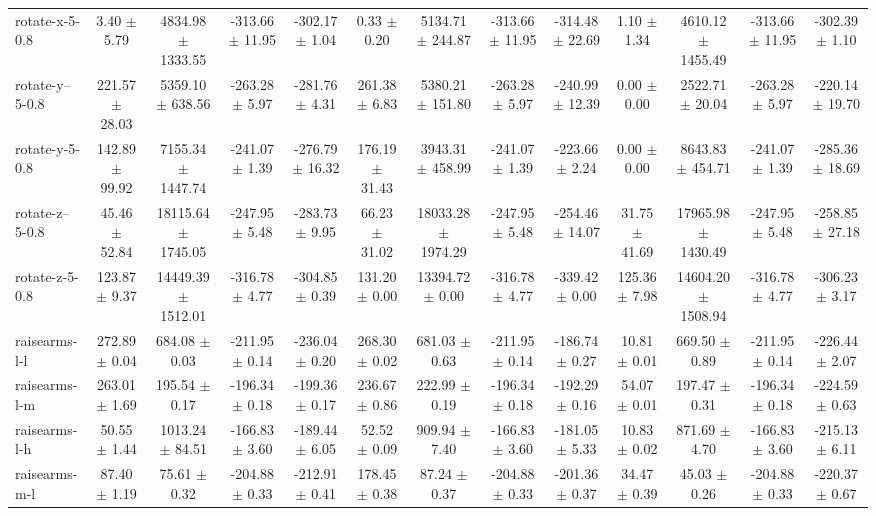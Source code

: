 \begin{tabular}{|lcccccccccccc|}
rotate-x-5-0.8 & 3.40 $\pm$ 5.79 & 4834.98 $\pm$ 1333.55 & -313.66 $\pm$ 11.95 & -302.17 $\pm$ 1.04 & 0.33 $\pm$ 0.20 & 5134.71 $\pm$ 244.87 & -313.66 $\pm$ 11.95 & -314.48 $\pm$ 22.69 & 1.10 $\pm$ 1.34 & 4610.12 $\pm$ 1455.49 & -313.66 $\pm$ 11.95 & -302.39 $\pm$ 1.10 \\
rotate-y--5-0.8 & 221.57 $\pm$ 28.03 & 5359.10 $\pm$ 638.56 & -263.28 $\pm$ 5.97 & -281.76 $\pm$ 4.31 & 261.38 $\pm$ 6.83 & 5380.21 $\pm$ 151.80 & -263.28 $\pm$ 5.97 & -240.99 $\pm$ 12.39 & 0.00 $\pm$ 0.00 & 2522.71 $\pm$ 20.04 & -263.28 $\pm$ 5.97 & -220.14 $\pm$ 19.70 \\
rotate-y-5-0.8 & 142.89 $\pm$ 99.92 & 7155.34 $\pm$ 1447.74 & -241.07 $\pm$ 1.39 & -276.79 $\pm$ 16.32 & 176.19 $\pm$ 31.43 & 3943.31 $\pm$ 458.99 & -241.07 $\pm$ 1.39 & -223.66 $\pm$ 2.24 & 0.00 $\pm$ 0.00 & 8643.83 $\pm$ 454.71 & -241.07 $\pm$ 1.39 & -285.36 $\pm$ 18.69 \\
rotate-z--5-0.8 & 45.46 $\pm$ 52.84 & 18115.64 $\pm$ 1745.05 & -247.95 $\pm$ 5.48 & -283.73 $\pm$ 9.95 & 66.23 $\pm$ 31.02 & 18033.28 $\pm$ 1974.29 & -247.95 $\pm$ 5.48 & -254.46 $\pm$ 14.07 & 31.75 $\pm$ 41.69 & 17965.98 $\pm$ 1430.49 & -247.95 $\pm$ 5.48 & -258.85 $\pm$ 27.18 \\
rotate-z-5-0.8 & 123.87 $\pm$ 9.37 & 14449.39 $\pm$ 1512.01 & -316.78 $\pm$ 4.77 & -304.85 $\pm$ 0.39 & 131.20 $\pm$ 0.00 & 13394.72 $\pm$ 0.00 & -316.78 $\pm$ 4.77 & -339.42 $\pm$ 0.00 & 125.36 $\pm$ 7.98 & 14604.20 $\pm$ 1508.94 & -316.78 $\pm$ 4.77 & -306.23 $\pm$ 3.17 \\
raisearms-l-l & 272.89 $\pm$ 0.04 & 684.08 $\pm$ 0.03 & -211.95 $\pm$ 0.14 & -236.04 $\pm$ 0.20 & 268.30 $\pm$ 0.02 & 681.03 $\pm$ 0.63 & -211.95 $\pm$ 0.14 & -186.74 $\pm$ 0.27 & 10.81 $\pm$ 0.01 & 669.50 $\pm$ 0.89 & -211.95 $\pm$ 0.14 & -226.44 $\pm$ 2.07 \\
raisearms-l-m & 263.01 $\pm$ 1.69 & 195.54 $\pm$ 0.17 & -196.34 $\pm$ 0.18 & -199.36 $\pm$ 0.17 & 236.67 $\pm$ 0.86 & 222.99 $\pm$ 0.19 & -196.34 $\pm$ 0.18 & -192.29 $\pm$ 0.16 & 54.07 $\pm$ 0.01 & 197.47 $\pm$ 0.31 & -196.34 $\pm$ 0.18 & -224.59 $\pm$ 0.63 \\
raisearms-l-h & 50.55 $\pm$ 1.44 & 1013.24 $\pm$ 84.51 & -166.83 $\pm$ 3.60 & -189.44 $\pm$ 6.05 & 52.52 $\pm$ 0.09 & 909.94 $\pm$ 7.40 & -166.83 $\pm$ 3.60 & -181.05 $\pm$ 5.33 & 10.83 $\pm$ 0.02 & 871.69 $\pm$ 4.70 & -166.83 $\pm$ 3.60 & -215.13 $\pm$ 6.11 \\
raisearms-m-l & 87.40 $\pm$ 1.19 & 75.61 $\pm$ 0.32 & -204.88 $\pm$ 0.33 & -212.91 $\pm$ 0.41 & 178.45 $\pm$ 0.38 & 87.24 $\pm$ 0.37 & -204.88 $\pm$ 0.33 & -201.36 $\pm$ 0.37 & 34.47 $\pm$ 0.39 & 45.03 $\pm$ 0.26 & -204.88 $\pm$ 0.33 & -220.37 $\pm$ 0.67 \\

\end{tabular}
